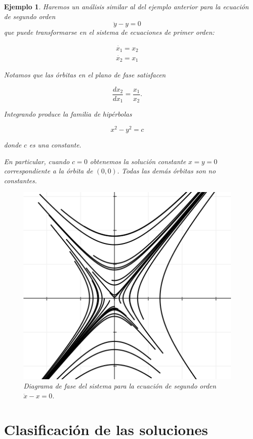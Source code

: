 \documentclass[11pt]{book}
\theoremstyle{definition}
\numberwithin{definition}{section}
\theoremstyle{theorem}
\numberwithin{theorem}{section}
\numberwithin{lemma}{section}
\numberwithin{corollary}{section}
\theoremstyle{plain}
\newtheorem{example}{Ejemplo}
\numberwithin{example}{section}
\begin{document}
\begin{example}
Haremos un análisis similar al del ejemplo anterior para la ecuación de segundo orden $$ \ddot{y} - y = 0$$ que puede transformarse en el sistema de ecuaciones de primer orden:

$$
\begin{array}{l}
	\dot{x_1} = x_2 \\
	\dot{x_2} = x_1
\end{array}
$$

Notamos que las órbitas en el plano de fase satisfacen

$$ \dfrac{dx_2}{dx_1} = \frac{x_1}{x_2}. $$

Integrando produce la familia de hipérbolas

$$ x^2 - y^2 = c $$

donde $c$ es una constante.

En particular, cuando $c = 0$ obtenemos la solución constante $x = y = 0$ correspondiente a la órbita de $(0,0)$. Todas las demás órbitas son no constantes.

\begin{figure}[!ht] \centering
	\includegraphics[scale=0.5]{figures/linearsystem-hyperbolas.png}
	\caption{Diagrama de fase del sistema para la ecuación de segundo orden $\ddot{x} - x = 0$.}
\end{figure}

\end{example}

\section{Clasificación de las soluciones}
\end{document}
